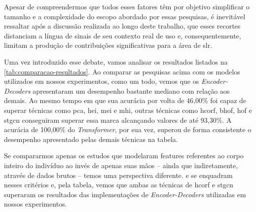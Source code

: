 Apesar de compreendermos que todos esses fatores têm por objetivo simplificar o tamanho e a complexidade do escopo abordado por essas pesquisas, é inevitável ressaltar após a discussão realizada ao longo deste trabalho, que esses recortes distanciam a língua de sinais de seu contexto real de uso e, consequentemente, limitam a produção de contribuições significativas para a área de \acrshort{slr}.






Uma vez introduzido esse debate, vamos analisar os resultados listados na \autoref{tab:comparacao-resultados}.
Ao comparar as pesquisas acima com os modelos utilizados em nossos experimentos, como um todo, vemos que os \textit{Encoder-Decoders} apresentaram um desempenho bastante mediano com relação aos demais. Ao mesmo tempo em que sua acurácia por volta de 46,00\% foi capaz de superar técnicas como \acrshort{pca}, \acrshort{hei}, \acrshort{mei} e \acrshort{mhi}, outras técnicas como \acrshort{hcorf}, \acrshort{bhof}, \acrshort{hof} e \acrshort{stgcn} conseguiram superar essa marca alcançando valores de até 93,30\%.
A acurácia de 100,00\% do \textit{Transformer}, por sua vez, superou de forma consistente o desempenho apresentado pelas demais técnicas na tabela.

Se compararmos apenas os estudos que modelaram features referentes ao corpo inteiro do indivíduo ao invés de apenas suas mãos -- ainda que indiretamente, através de dados brutos -- temos uma perspectiva diferente.  e  se enquadram nesses critérios e, pela tabela, vemos que ambas as técnicas de \acrshort{hcorf} e \acrshort{stgcn} superaram os resultados das implementações de \textit{Encoder-Decoders} utilizadas em nossos experimentos.



